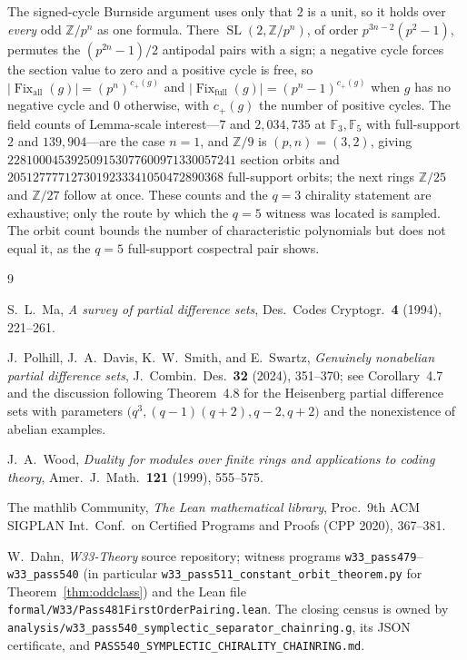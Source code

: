 \documentclass[11pt]{article}
\theoremstyle{plain}
\theoremstyle{definition}
\newcommand{\FF}{\mathbb F}
\newcommand{\ZZ}{\mathbb Z}
\begin{document}
The signed-cycle Burnside argument uses only that $2$ is a unit, so it holds
over \emph{every} odd $\ZZ/p^{n}$ as one formula. There $\operatorname{SL}(2,
\ZZ/p^{n})$, of order $p^{3n-2}(p^2-1)$, permutes the $(p^{2n}-1)/2$ antipodal
pairs with a sign; a negative cycle forces the section value to zero and a
positive cycle is free, so $\lvert\operatorname{Fix}_{\mathrm{all}}(g)\rvert
=(p^{n})^{c_+(g)}$ and $\lvert\operatorname{Fix}_{\mathrm{full}}(g)\rvert
=(p^{n}-1)^{c_+(g)}$ when $g$ has no negative cycle and $0$ otherwise, with
$c_+(g)$ the number of positive cycles. The field counts of
Lemma-scale interest---$7$ and $2{,}034{,}735$ at $\FF_3,\FF_5$ with full-support
$2$ and $139{,}904$---are the case $n=1$, and $\ZZ/9$ is $(p,n)=(3,2)$, giving
$228100045392509153077600971330057241$ section orbits and
$2051277771273019233341050472890368$ full-support orbits; the next rings
$\ZZ/25$ and $\ZZ/27$ follow at once. These counts and the $q=3$ chirality
statement are exhaustive; only the route by which the $q=5$ witness was located
is sampled. The orbit count bounds the number of characteristic polynomials but
does not equal it, as the $q=5$ full-support cospectral pair shows.

\begin{thebibliography}{9}

S.~L.~Ma,
\emph{A survey of partial difference sets},
Des.\ Codes Cryptogr.\ \textbf{4} (1994), 221--261.

J.~Polhill, J.~A.~Davis, K.~W.~Smith, and E.~Swartz,
\emph{Genuinely nonabelian partial difference sets},
J.~Combin.\ Des.\ \textbf{32} (2024), 351--370; see Corollary~4.7 and the
discussion following Theorem~4.8 for the Heisenberg partial difference sets
with parameters $\bigl(q^3,(q-1)(q+2),q-2,q+2\bigr)$ and the nonexistence of
abelian examples.

J.~A.~Wood,
\emph{Duality for modules over finite rings and applications to coding theory},
Amer.\ J.\ Math.\ \textbf{121} (1999), 555--575.

The mathlib Community,
\emph{The Lean mathematical library},
Proc.\ 9th ACM SIGPLAN Int.\ Conf.\ on Certified Programs and Proofs (CPP 2020),
367--381.

W.~Dahn, \emph{W33-Theory} source repository; witness programs
\texttt{w33\_pass479}--\texttt{w33\_pass540} (in particular
\texttt{w33\_pass511\_constant\_orbit\_theorem.py} for
Theorem~\ref{thm:oddclass}) and the Lean file
\texttt{formal/W33/Pass481FirstOrderPairing.lean}.  The closing census is
owned by \texttt{analysis/w33\_pass540\_symplectic\_separator\_chainring.g},
its JSON certificate, and
\texttt{PASS540\_SYMPLECTIC\_CHIRALITY\_CHAINRING.md}.

\end{thebibliography}
\end{document}
